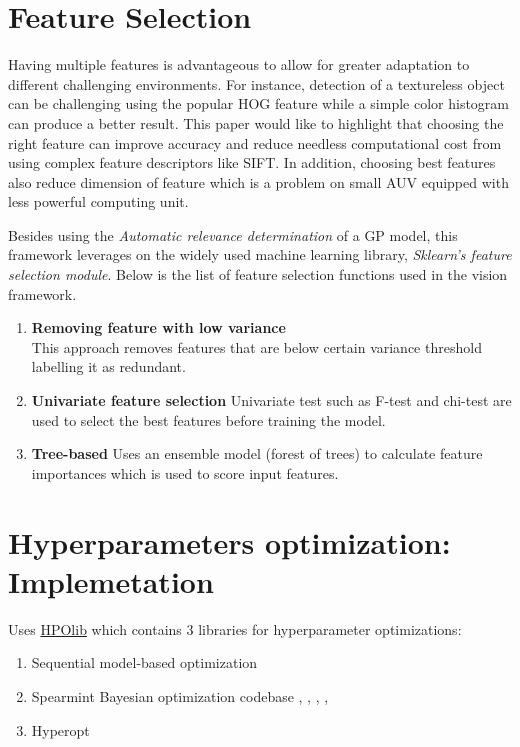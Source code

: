 \documentclass[fypca]{socreport}
\begin{document}
\section{Feature Selection}

Having multiple features is advantageous to allow for greater adaptation to
different challenging environments. For instance, detection of a textureless
object can be challenging using the popular HOG feature while a simple color
histogram can produce a better result. This paper would like to highlight that
choosing the right feature can improve accuracy and reduce needless
computational cost from using complex feature descriptors like SIFT. In
addition, choosing best features also reduce dimension of feature which is a
problem on small AUV equipped with less powerful computing unit.

Besides using the \textit{Automatic relevance determination} of a GP model, this
framework leverages on the widely used machine learning library,
\textit{Sklearn's feature selection module}. Below is the list of feature
selection functions used in the vision framework.

\begin{enumerate}

    \item \textbf{Removing feature with low variance} \\
    This approach removes features that are below certain variance threshold
    labelling it as redundant.

    \item \textbf{Univariate feature selection}
    Univariate test such as F-test and chi-test are used to select the best
    features before training the model.

    \item \textbf{Tree-based}
    Uses an ensemble model (forest of trees) to calculate feature importances
    which is used to score input features.

\end{enumerate}

\section{Hyperparameters optimization: Implemetation}

Uses \href{https://github.com/automl/HPOlib}{HPOlib} which contains 3 libraries for hyperparameter optimizations:

\begin{enumerate}
  \item Sequential model-based optimization 
  \item Spearmint Bayesian optimization codebase ,
    , ,
    , 
  \item Hyperopt
\end{enumerate}
\end{document}
